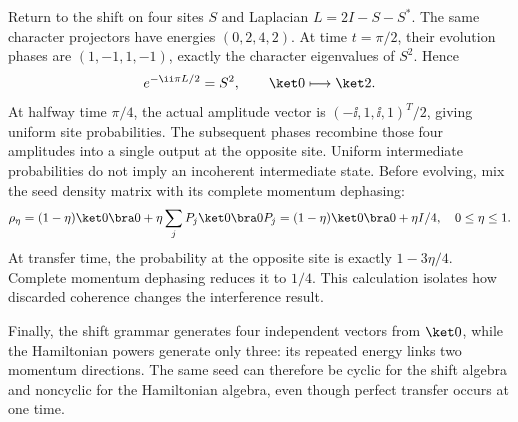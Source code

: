 Return to the shift on four sites $S$ and Laplacian $L=2I-S-S^*$. The same character projectors have energies $(0,2,4,2)$. At time $t=\pi/2$, their evolution phases are $(1,-1,1,-1)$, exactly the character eigenvalues of $S^2$. Hence
\[
e^{-\ii\pi L/2}=S^2,\qquad
\ket0\longmapsto\ket2.
\]
At halfway time $\pi/4$, the actual amplitude vector is $(-\ii,1,\ii,1)^T/2$, giving uniform site probabilities. The subsequent phases recombine those four amplitudes into a single output at the opposite site. Uniform intermediate probabilities do not imply an incoherent intermediate state.
Before evolving, mix the seed density matrix with its complete momentum dephasing:
\[
\rho_\eta=(1-\eta)\ket0\bra0+\eta\sum_jP_j\ket0\bra0P_j
=(1-\eta)\ket0\bra0+\eta I/4,
\quad0\le\eta\le1.
\]
At transfer time, the probability at the opposite site is exactly $1-3\eta/4$. Complete momentum dephasing reduces it to $1/4$. This calculation isolates how discarded coherence changes the interference result.

Finally, the shift grammar generates four independent vectors from $\ket0$, while the Hamiltonian powers generate only three: its repeated energy links two momentum directions. The same seed can therefore be cyclic for the shift algebra and noncyclic for the Hamiltonian algebra, even though perfect transfer occurs at one time.

